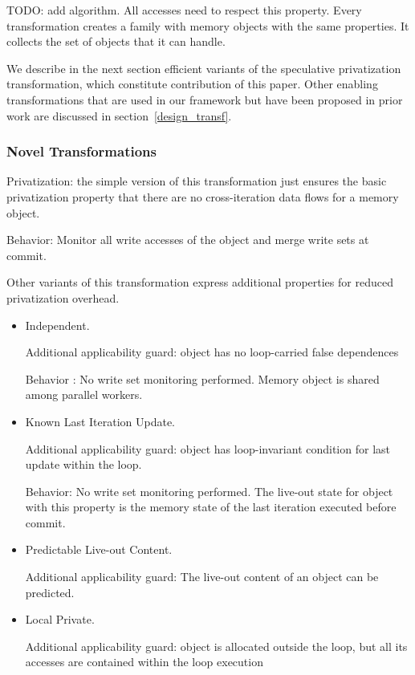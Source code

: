 TODO: add algorithm. All accesses need to respect this property. Every
transformation creates a family with memory objects with the same
properties.  It collects the set of objects that it can handle.



We describe in the next section efficient variants of the speculative
privatization transformation, which constitute contribution of this
paper.  Other enabling transformations that are used in our framework
but have been proposed in prior work are discussed in
section~\ref{design_transf}.

\subsubsection{Novel Transformations}

Privatization: the simple version of this transformation just
ensures the basic privatization property that there are no
cross-iteration data flows for a memory object.

Behavior: Monitor all write accesses of the object and merge write
sets at commit.

Other variants of this transformation express additional properties for
reduced privatization overhead.
%
\begin{itemize}
%
\item Independent.

Additional applicability guard: object has no
loop-carried false dependences

Behavior : No write set monitoring performed. Memory object is shared among parallel workers.
%
%
\item Known Last Iteration Update.

Additional applicability guard:
object has loop-invariant condition for last update within the loop.

Behavior: No write set monitoring performed. The live-out state for
object with this property is the memory state of the last iteration
executed before commit.
%
%
\item Predictable Live-out Content.

Additional applicability guard:
The live-out content of an object can be predicted.
%
%
\item Local Private.

Additional applicability guard: object is
allocated outside the loop, but all its accesses are contained within
the loop execution
%
\end{itemize}


